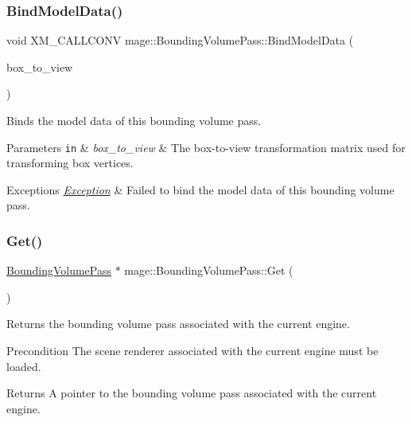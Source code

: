 \subsubsection{\texorpdfstring{Bind\+Model\+Data()}{BindModelData()}}
{\footnotesize\ttfamily void X\+M\+\_\+\+C\+A\+L\+L\+C\+O\+NV mage\+::\+Bounding\+Volume\+Pass\+::\+Bind\+Model\+Data (\begin{DoxyParamCaption}\item[{F\+X\+M\+M\+A\+T\+R\+IX}]{box\+\_\+to\+\_\+view }\end{DoxyParamCaption})\hspace{0.3cm}{\ttfamily [private]}}

Binds the model data of this bounding volume pass.


\begin{DoxyParams}[1]{Parameters}
\mbox{\tt in}  & {\em box\+\_\+to\+\_\+view} & The box-\/to-\/view transformation matrix used for transforming box vertices. \\
\hline
\end{DoxyParams}

\begin{DoxyExceptions}{Exceptions}
{\em \hyperlink{classmage_1_1_exception}{Exception}} & Failed to bind the model data of this bounding volume pass. \\
\hline
\end{DoxyExceptions}
\hypertarget{classmage_1_1_bounding_volume_pass_a254c44c1c9f18967c9d6cdb6e53d3bcd}{}\label{classmage_1_1_bounding_volume_pass_a254c44c1c9f18967c9d6cdb6e53d3bcd} 
\subsubsection{\texorpdfstring{Get()}{Get()}}
{\footnotesize\ttfamily \hyperlink{classmage_1_1_bounding_volume_pass}{Bounding\+Volume\+Pass} $\ast$ mage\+::\+Bounding\+Volume\+Pass\+::\+Get (\begin{DoxyParamCaption}{ }\end{DoxyParamCaption})\hspace{0.3cm}{\ttfamily [static]}}

Returns the bounding volume pass associated with the current engine.

\begin{DoxyPrecond}{Precondition}
The scene renderer associated with the current engine must be loaded. 
\end{DoxyPrecond}
\begin{DoxyReturn}{Returns}
A pointer to the bounding volume pass associated with the current engine. 
\end{DoxyReturn}
\hypertarget{classmage_1_1_bounding_volume_pass_a7d4e1142dcdec337c2884ab305f6d1ac}{}\label{classmage_1_1_bounding_volume_pass_a7d4e1142dcdec337c2884ab305f6d1ac} 
